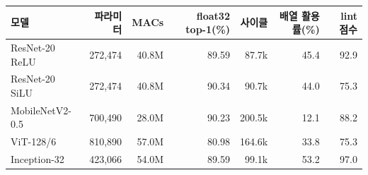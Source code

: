 \setlength{\tabcolsep}{5pt}
\begin{tabular}{lrrrrrr}
\toprule
모델 & 파라미터 & MACs & float32 top-1(\%) & 사이클 & 배열 활용률(\%) & lint 점수 \\
\midrule
ResNet-20 ReLU & 272,474 & 40.8M & 89.59 & 87.7k & 45.4 & 92.9 \\
ResNet-20 SiLU & 272,474 & 40.8M & 90.34 & 90.7k & 44.0 & 75.3 \\
MobileNetV2-0.5 & 700,490 & 28.0M & 90.23 & 200.5k & 12.1 & 88.2 \\
ViT-128/6 & 810,890 & 57.0M & 80.98 & 164.6k & 33.8 & 75.3 \\
Inception-32 & 423,066 & 54.0M & 89.59 & 99.1k & 53.2 & 97.0 \\
\bottomrule
\end{tabular}
